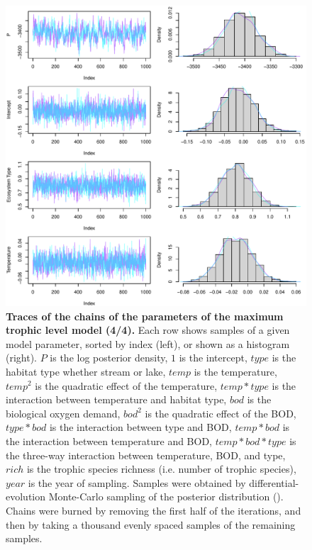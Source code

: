 \documentclass[11pt, oneside]{article}
\begin{document}
\begin{figure}[H]
\begin{center}
\includegraphics[page=4, width=1\linewidth]{scripts/b0_6_4/out_mTL/fig_tracePlot_beta.pdf}
\caption{
    \textbf{Traces of the chains of the parameters of the maximum trophic level model (4/4).}
    Each row shows samples of a given model parameter, sorted by index (left), or shown as a histogram (right).
    $P$ is the log posterior density, $1$ is the intercept, $type$ is the habitat type whether stream or lake, $temp$ is the temperature, $temp^2$ is the quadratic effect of the temperature, $temp * type$ is the interaction between temperature and habitat type, $bod$ is the biological oxygen demand, $bod^2$ is the quadratic effect of the BOD, $type * bod$ is the interaction between type and BOD, $temp * bod$ is the interaction between temperature and BOD, $temp * bod * type$ is the three-way interaction between temperature, BOD, and type, $rich$ is the trophic species richness (i.e. number of trophic species), $year$ is the year of sampling.
    Samples were obtained by differential-evolution Monte-Carlo sampling of the posterior distribution (\cite{TerBraak2006}).
    Chains were burned by removing the first half of the iterations, and then by taking a thousand evenly spaced samples of the remaining samples.
} 
\end{center}
\end{figure}
\end{document}

